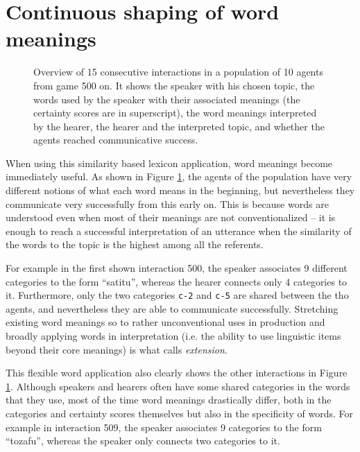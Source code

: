 \section{Continuous shaping of word meanings}

\begin{figure}[p]
  {}
  \caption{Overview of 15 consecutive interactions in a population of
    10 agents from game 500 on. It shows the speaker with his chosen
    topic, the words used by the speaker with their associated
    meanings (the certainty scores are in superscript), the word
    meanings interpreted by the hearer, the hearer and the interpreted
    topic, and whether the agents reached communicative success.}
  \label{f:sfwm-trace}
\end{figure}



When using this similarity based lexicon application, word meanings
become immediately useful. As shown in Figure \ref{f:sfwm-trace}, the
agents of the population have very different notions of what each word
means in the beginning, but nevertheless they communicate very
successfully from this early on. This is because words are understood
even when most of their meanings are not conventionalized -- it is
enough to reach a successful interpretation of an utterance when the
similarity of the words to the topic is the highest among all the
referents. 

For example in the first shown interaction 500, the speaker associates
9 different categories to the form ``satitu'', whereas the hearer
connects only 4 categories to it. Furthermore, only the two categories
\texttt{c-2} and \texttt{c-5} are shared between the tho agents, and
nevertheless they are able to communicate successfully. Stretching
existing word meanings so to rather unconventional uses in production
and broadly applying words in interpretation (i.e. the ability to use
linguistic items beyond their core meanings) is what
\cite{langacker00dynamic} calls \emph{extension}.

This flexible word application also clearly shows the other
interactions in Figure \ref{f:sfwm-trace}. Although speakers and
hearers often have some shared categories in the words that they use,
most of the time word meanings drastically differ, both in the
categories and certainty scores themselves but also in the specificity
of words. For example in interaction 509, the speaker associates 9
categories to the form ``tozafu'', whereas the speaker only connects
two categories to it.

